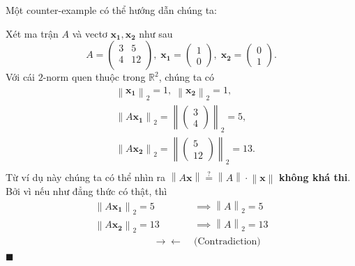 \documentclass{article}
\newcommand{\norm}[1]{\left\lVert#1\right\rVert}
\newcommand{\twonorm}[1]{\left\lVert#1\right\rVert_{2}}
\renewcommand\qedsymbol{$\blacksquare$}
\begin{document}
Một counter-example có thể hướng dẫn chúng ta:
\begin{Spiel}
	Xét ma trận $A$ và vectơ $\mathbf{x_1}, \mathbf{x_2}$ như sau
  $$
    A = \begin{pmatrix}
    	3 &  5 \\
    	4 & 12 \\
    \end{pmatrix},\;
    \mathbf{x_1} = \begin{pmatrix} 1 \\ 0 \end{pmatrix},\;
    \mathbf{x_2} = \begin{pmatrix} 0 \\ 1 \end{pmatrix}.
  $$
  Với cái $2$-norm quen thuộc trong $\mathbb{R}^2$, chúng ta có
  $$
	  \begin{aligned}
			& \norm{\mathbf{x_1}}_{2} = 1,\; \twonorm{\mathbf{x_2}} = 1, \nonumber \\
			& \norm{A \mathbf{x_1}}_{2} = \norm{\begin{pmatrix} 3 \\ 4 \end{pmatrix}}_{2} = 5, \\
			& \norm{A \mathbf{x_2}}_{2} = \norm{\begin{pmatrix} 5 \\ 12 \end{pmatrix}}_{2} = 13. \\
	  \end{aligned}
  $$
	Từ ví dụ này chúng ta có thể nhìn ra $\norm{A\mathbf{x}} \stackrel{?}{=} \norm{A}\cdot\norm{\mathbf{x}}$ \textbf{không khá thi}. Bởi vì nếu như đẳng thức có thật, thì 
  $$
	  \begin{aligned}
			\norm{A \mathbf{x_1}}_{2} = 5 &\implies \norm{A}_{2} = 5 \\
			\norm{A \mathbf{x_2}}_{2} = 13 &\implies \norm{A}_{2} = 13 \\
			\qquad\qquad\qquad \rightarrow\!\leftarrow\; &\text{(Contradiction)}
	  \end{aligned}
  $$
  \hfill\qedsymbol
\end{Spiel}
\end{document}
